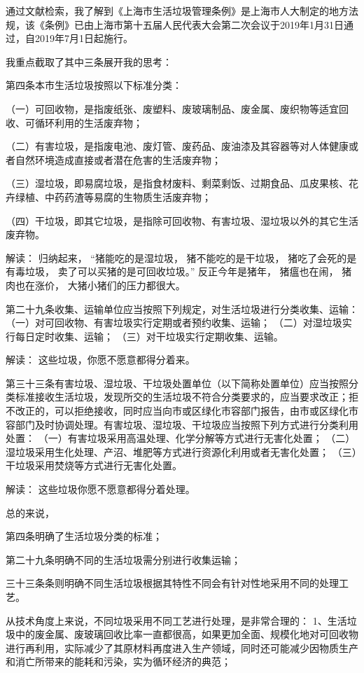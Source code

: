 \documentclass[]{book}
\begin{document}
通过文献检索，我了解到《上海市生活垃圾管理条例》是上海市人大制定的地方法规，该《条例》已由上海市第十五届人民代表大会第二次会议于2019年1月31日通过，自2019年7月1日起施行。

我重点截取了其中三条展开我的思考：

第四条本市生活垃圾按照以下标准分类：

（一）可回收物，是指废纸张、废塑料、废玻璃制品、废金属、废织物等适宜回收、可循环利用的生活废弃物；

（二）有害垃圾，是指废电池、废灯管、废药品、废油漆及其容器等对人体健康或者自然环境造成直接或者潜在危害的生活废弃物；

（三）湿垃圾，即易腐垃圾，是指食材废料、剩菜剩饭、过期食品、瓜皮果核、花卉绿植、中药药渣等易腐的生物质生活废弃物；

（四）干垃圾，即其它垃圾，是指除可回收物、有害垃圾、湿垃圾以外的其它生活废弃物。

解读：
归纳起来，
``猪能吃的是湿垃圾，
猪不能吃的是干垃圾，
猪吃了会死的是有毒垃圾，
卖了可以买猪的是可回收垃圾。''
反正今年是猪年，
猪瘟也在闹，
猪肉也在涨价，
大猪小猪们的压力都很大。

第二十九条收集、运输单位应当按照下列规定，对生活垃圾进行分类收集、运输：
（一）对可回收物、有害垃圾实行定期或者预约收集、运输；
（二）对湿垃圾实行每日定时收集、运输；
（三）对干垃圾实行定期收集、运输。

解读：
这些垃圾，你愿不愿意都得分着来。

第三十三条有害垃圾、湿垃圾、干垃圾处置单位（以下简称处置单位）应当按照分类标准接收生活垃圾，发现所交的生活垃圾不符合分类要求的，应当要求改正；拒不改正的，可以拒绝接收，同时应当向市或区绿化市容部门报告，由市或区绿化市容部门及时协调处理。有害垃圾、湿垃圾、干垃圾应当按照下列方式进行分类利用处置：
（一）有害垃圾采用高温处理、化学分解等方式进行无害化处置；
（二）湿垃圾采用生化处理、产沼、堆肥等方式进行资源化利用或者无害化处置；
（三）干垃圾采用焚烧等方式进行无害化处置。

解读：
这些垃圾你愿不愿意都得分着处理。

总的来说，

第四条明确了生活垃圾分类的标准；

第二十九条明确不同的生活垃圾需分别进行收集运输；

三十三条条则明确不同生活垃圾根据其特性不同会有针对性地采用不同的处理工艺。

从技术角度上来说，不同垃圾采用不同工艺进行处理，是非常合理的：
1、生活垃圾中的废金属、废玻璃回收比率一直都很高，如果更加全面、规模化地对可回收物进行再利用，实际减少了其原材料再度进入生产领域，同时还可能减少因物质生产和消亡所带来的能耗和污染，实为循环经济的典范；
\end{document}
